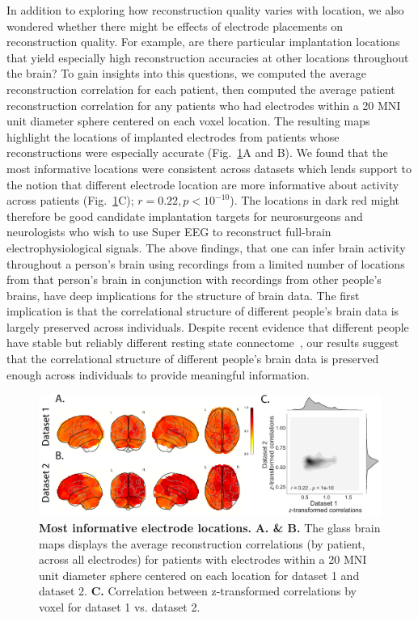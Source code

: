 \documentclass[12pt]{article}
\begin{document}
In addition to exploring how reconstruction quality varies with
location, we also wondered whether there might be effects of electrode
placements on reconstruction quality.  For example, are there
particular implantation locations that yield especially high
reconstruction accuracies at other locations throughout the brain? To gain insights into this questions, we computed the average reconstruction correlation for each patient, then computed the average patient reconstruction correlation for any patients who had electrodes within a 20 MNI unit diameter sphere centered on each voxel location. The resulting maps highlight the locations of implanted electrodes from patients whose
reconstructions were especially accurate  (Fig.~\ref{fig:informap}A and B). We found that the most informative locations were consistent across datasets which lends support to the notion that different electrode location are more informative about activity across patients (Fig.~\ref{fig:informap}C); $r = 0.22, p < 10^{-10}$).  The locations in dark red might therefore be good candidate
implantation targets for neurosurgeons and neurologists who wish to
use Super EEG to reconstruct full-brain electrophysiological signals.
The above findings, that one can infer brain activity throughout a person's brain 
using recordings from a limited number of locations from that person's brain in conjunction with recordings from other people's brains, have deep
implications for the structure of brain data.  The first implication
is that the correlational structure of different people's brain data
is largely preserved across individuals. Despite recent evidence that different people have stable but reliably different resting state connectome~\cite{FinnEtal15}, our results suggest that the correlational structure of different people's brain data is preserved enough across individuals to provide meaningful information. 

\begin{figure}
  \centering
  \includegraphics[width=\textwidth]{figs/informap}
  \caption{\textbf{Most informative electrode locations.} \textbf{A. \& B. } The glass
    brain maps displays the average reconstruction correlations (by patient, across
    all electrodes) for patients with electrodes within a 20 MNI unit diameter sphere centered on
    each location for dataset 1 and dataset 2. \textbf{C.} Correlation between z-transformed correlations by voxel for dataset 1 vs. dataset 2.}
  \label{fig:informap}
\end{figure}
\end{document}
